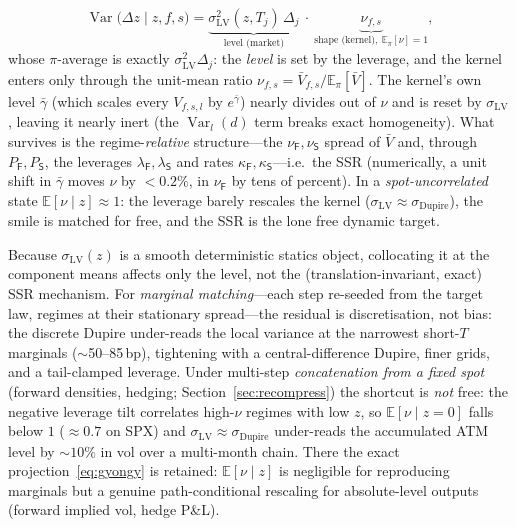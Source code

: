 \documentclass[11pt]{article}
\newcommand{\E}{\mathbb{E}}
\newcommand{\Var}{\operatorname{Var}}
\begin{document}
\begin{equation}
\Var\!\big(\Delta z\mid z,f,s\big)
=\underbrace{\sigma_{\mathrm{LV}}^2(z,T_j)\,\Delta_j}_{\text{level (market)}}\ \cdot\
\underbrace{\nu_{f,s}}_{\text{shape (kernel)},\ \E_\pi[\nu]=1},
\label{eq:decouple}
\end{equation}
whose $\pi$-average is exactly $\sigma_{\mathrm{LV}}^2\Delta_j$: the \emph{level} is set by the
leverage, and the kernel enters only through the unit-mean ratio $\nu_{f,s}=\bar V_{f,s}/\E_\pi[\bar V]$.
The kernel's own level $\bar\gamma$ (which scales every $V_{f,s,l}$ by $e^{\bar\gamma}$) nearly divides
out of $\nu$ and is reset by $\sigma_{\mathrm{LV}}$, leaving it nearly inert (the $\Var_l(d)$ term breaks
exact homogeneity). What survives is the regime-\emph{relative} structure---the
$\nu_{\mathsf{F}},\nu_{\mathsf{S}}$ spread of $\bar V$ and, through $P_{\mathsf{F}},P_{\mathsf{S}}$, the
leverages $\lambda_{\mathsf{F}},\lambda_{\mathsf{S}}$ and rates $\kappa_{\mathsf{F}},\kappa_{\mathsf{S}}$---i.e.\
the SSR (numerically, a unit shift in $\bar\gamma$ moves $\nu$ by $<0.2\%$, in $\nu_{\mathsf{F}}$ by tens
of percent). In a \emph{spot-uncorrelated} state $\E[\nu\mid z]\approx1$: the leverage barely rescales
the kernel ($\sigma_{\mathrm{LV}}\approx\sigma_{\mathrm{Dupire}}$), the smile is matched for free, and
the SSR is the lone free dynamic target.

Because $\sigma_{\mathrm{LV}}(z)$ is a smooth deterministic statics object, collocating it at the
component means affects only the level, not the (translation-invariant, exact) SSR mechanism. For
\emph{marginal matching}---each step re-seeded from the target law, regimes at their stationary
spread---the residual is discretisation, not bias: the discrete Dupire under-reads the local variance at
the narrowest short-$T$ marginals ($\sim$50--85\,bp), tightening with a central-difference Dupire, finer
grids, and a tail-clamped leverage. Under multi-step \emph{concatenation from a fixed spot} (forward
densities, hedging; Section~\ref{sec:recompress}) the shortcut is \emph{not} free: the negative leverage
tilt correlates high-$\nu$ regimes with low $z$, so $\E[\nu\mid z{=}0]$ falls below $1$ ($\approx\!0.7$ on
SPX) and $\sigma_{\mathrm{LV}}\approx\sigma_{\mathrm{Dupire}}$ under-reads the accumulated ATM level by
${\sim}10\%$ in vol over a multi-month chain. There the exact projection~\eqref{eq:gyongy} is retained:
$\E[\nu\mid z]$ is negligible for reproducing marginals but a genuine path-conditional rescaling for
absolute-level outputs (forward implied vol, hedge P\&L).
\end{document}
